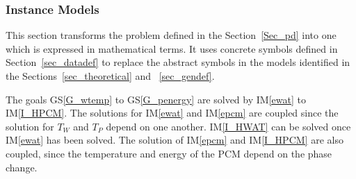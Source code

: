 \documentclass[12pt]{article}
\newcommand{\gsref}[1]{GS\ref{#1}}
\newcommand{\iref}[1]{IM\ref{#1}}
\begin{document}
\subsubsection{Instance Models} \label{sec_instance}    

This section transforms the problem defined in the Section~\ref{Sec_pd} into 
one which is expressed in mathematical terms. It uses concrete symbols defined 
in Section~\ref{sec_datadef} to replace the abstract symbols in the models 
identified in the Sections~\ref{sec_theoretical} and ~\ref{sec_gendef}.

The goals \gsref{G_wtemp} to \gsref{G_penergy} are solved by \iref{ewat} to
\iref{I_HPCM}.  The solutions for \iref{ewat} and \iref{epcm} are
coupled since the solution for $T_W$ and $T_P$ depend on one another.
\iref{I_HWAT} can be solved once \iref{ewat} has been solved.  The solution of
\iref{epcm} and \iref{I_HPCM} are also coupled, since the temperature and energy
of the PCM depend on the phase change.


~\newline

\end{document}

